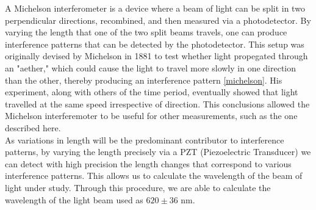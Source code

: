 A Michelson interferometer is a device where a beam of light can be split in two perpendicular directions, recombined, and then measured via a photodetector. By varying the length that one of the two split beams travels, one can produce interference patterns that can be detected by the photodetector. This setup was originally devised by Michelson in 1881 to test whether light propegated through an "aether," which could cause the light to travel more slowly in one direction than the other, thereby producing an interference pattern \ref{michelson}. His experiment, along with others of the time period, eventually showed that light travelled at the same speed irrespective of direction. This conclusions allowed the Michelson interferemoter to be useful for other measurements, such as the one described here.
  \\
  As variations in length will be the predominant contributor to interference patterns, by varying the length precisely via a PZT (Piezoelectric Transducer) we can detect with high precision the length changes that correspond to various interference patterns. This allows us to calculate the wavelength of the beam of light under study. Through this procedure, we are able to calculate the wavelength of the light beam used as $620 \pm 36$ nm.
  \\

